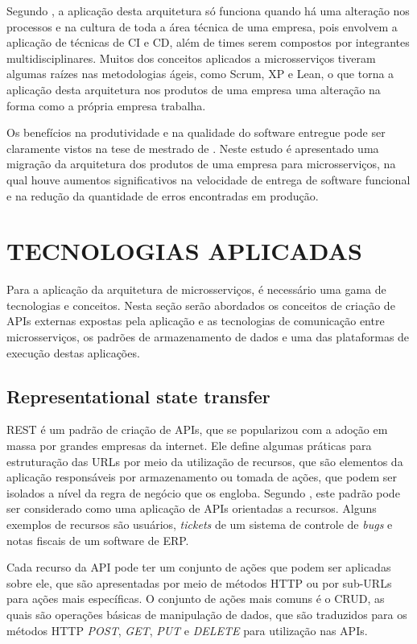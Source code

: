 Segundo , a aplicação desta arquitetura só funciona
quando há uma alteração nos processos e na cultura de toda a área técnica
de uma empresa, pois envolvem a aplicação de técnicas de \ac{CI} e \ac{CD},
além de times serem compostos por integrantes multidisciplinares. Muitos dos
conceitos aplicados a microsserviços tiveram algumas raízes nas metodologias
ágeis, como Scrum, XP e Lean, o que torna a aplicação desta arquitetura nos
produtos de uma empresa uma alteração na forma como a própria empresa trabalha.

Os benefícios na produtividade e na qualidade do software entregue pode
ser claramente vistos na tese de mestrado de . Neste
estudo é apresentado uma migração da arquitetura dos produtos de uma empresa
para microsserviços, na qual houve aumentos significativos na velocidade de
entrega de software funcional e na redução da quantidade de erros
encontradas em produção.

\section{TECNOLOGIAS APLICADAS}

Para a aplicação da arquitetura de microsserviços, é necessário uma gama de
tecnologias e conceitos. Nesta seção serão abordados os conceitos de criação
de APIs externas expostas pela aplicação e as tecnologias de comunicação entre
microsserviços, os padrões de armazenamento de dados e uma das plataformas de
execução destas aplicações.

\subsection{Representational state transfer}

\ac{REST} é um padrão de criação de \acp{API}, que se popularizou com a
adoção em massa por grandes empresas da internet. Ele define algumas práticas
para estruturação das \acp{URL} por meio da utilização de recursos, que são
elementos da aplicação responsáveis por armazenamento ou tomada de ações, que
podem ser isolados a nível da regra de negócio que os engloba. Segundo
, este padrão pode ser considerado como uma aplicação
de \acp{API} orientadas a recursos. Alguns exemplos de recursos são usuários,
\emph{tickets} de um sistema de controle de \emph{bugs} e notas fiscais de um
software de \ac{ERP}.

Cada recurso da \ac{API} pode ter um conjunto de ações que podem ser
aplicadas sobre ele, que são apresentadas por meio de métodos \ac{HTTP} ou
por sub-\acp{URL} para ações mais específicas. O conjunto de ações mais
comuns é o \ac{CRUD}, as quais são operações básicas de manipulação de dados,
que são traduzidos para os métodos \ac{HTTP} \emph{POST}, \emph{GET},
\emph{PUT} e \emph{DELETE} para utilização nas \acp{API}.

